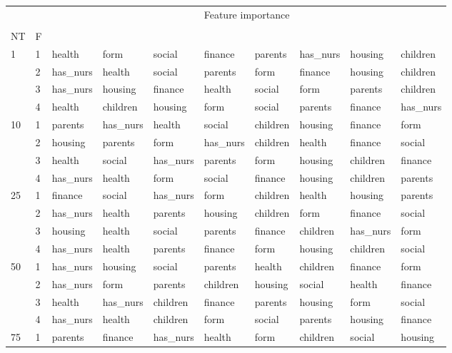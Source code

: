 \begin{table}[htbp]
\centering
\label{nursery-features}
\begin{tabular}{llllllllll}
\toprule
 &  & \multicolumn{8}{c}{Feature importance} \\
 &  & #1 & #2 & #3 & #4 & #5 & #6 & #7 & #8 \\
NT & F &  &  &  &  &  &  &  &  \\
\midrule
\multirow[c]{4}{*}{1} & 1 & health & form & social & finance & parents & has_nurs & housing & children \\
 & 2 & has_nurs & health & social & parents & form & finance & housing & children \\
 & 3 & has_nurs & housing & finance & health & social & form & parents & children \\
 & 4 & health & children & housing & form & social & parents & finance & has_nurs \\
\multirow[c]{4}{*}{10} & 1 & parents & has_nurs & health & social & children & housing & finance & form \\
 & 2 & housing & parents & form & has_nurs & children & health & finance & social \\
 & 3 & health & social & has_nurs & parents & form & housing & children & finance \\
 & 4 & has_nurs & health & form & social & finance & housing & children & parents \\
\multirow[c]{4}{*}{25} & 1 & finance & social & has_nurs & form & children & health & housing & parents \\
 & 2 & has_nurs & health & parents & housing & children & form & finance & social \\
 & 3 & housing & health & social & parents & finance & children & has_nurs & form \\
 & 4 & has_nurs & health & parents & finance & form & housing & children & social \\
\multirow[c]{4}{*}{50} & 1 & has_nurs & housing & social & parents & health & children & finance & form \\
 & 2 & has_nurs & form & parents & children & housing & social & health & finance \\
 & 3 & health & has_nurs & children & finance & parents & housing & form & social \\
 & 4 & has_nurs & health & children & form & social & parents & housing & finance \\
\multirow[c]{4}{*}{75} & 1 & parents & finance & has_nurs & health & form & children & social & housing \\

\end{tabular}
\end{table}
